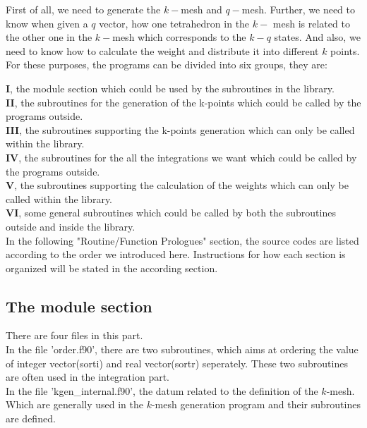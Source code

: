 \documentclass[10pt]{article}
\begin{document}
First of all, we need to generate the $k-$mesh and $q-$mesh. Further, we need to know when given a $q$ vector, how one tetrahedron in the $k-$ mesh is related to the other one in the $k-$mesh which corresponds to the $k-q$ states. And also, we need to know how to calculate the weight and distribute it into different $k$ points. For these purposes, the programs can be divided into six groups, they are:

\textbf{I}, the module section which could be used by the subroutines in the library.\\

\textbf{II}, the subroutines for the generation of the k-points which could be called by the programs outside.\\

\textbf{III}, the subroutines supporting the k-points generation which can only be called within the library.\\

\textbf{IV}, the subroutines for the all the integrations we want which could be called by the programs outside.\\

\textbf{V}, the subroutines supporting the calculation of the weights which can only be called within the library.\\

\textbf{VI}, some general subroutines which could be called by both the subroutines outside and inside the library.\\

In the following "Routine/Function Prologues" section, the source codes are listed according to the order we introduced here. Instructions for how each section is organized will be stated in the according section.\\ 


\subsection{The module section}


There are four files in this part. \\


In the file 'order.f90', there are two subroutines, which aims at ordering the value of integer vector(sorti) and real vector(sortr) seperately. These two subroutines are often used in the integration part.\\


In the file 'kgen\_internal.f90', the datum related to the definition of the $k$-mesh. Which are generally used in the $k$-mesh generation program and their subroutines are defined. \\
\end{document}
